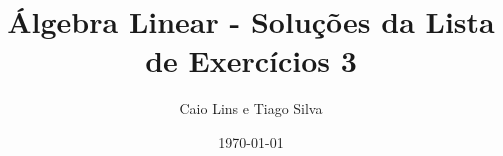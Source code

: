 \documentclass[leqno]{article}
\numberwithin{equation}{section}
\begin{document}
\newtheorem{teo}{Teorema}[section] \newtheorem*{teo*}{Teorema}
\newtheorem{prop}[teo]{Proposição} \newtheorem*{prop*}{Proposição}
\newtheorem{lema}[teo]{Lemma} \newtheorem*{lema*}{Lema}
\newtheorem{cor}[teo]{Corolário} \newtheorem*{cor*}{Corolário}

\theoremstyle{definition}
\newtheorem{defi}[teo]{Definição} \newtheorem*{defi*}{Definição}
\newtheorem{exem}[teo]{Exemplo} \newtheorem*{exem*}{Exemplo}
\newtheorem{obs}[teo]{Observação} \newtheorem*{obs*}{Observação}
\newtheorem*{hipo}{Hipóteses}
\newtheorem*{nota}{Notação}

\newcommand{\ds}{\displaystyle} \newcommand{\nl}{\newline}
\newcommand{\eps}{\varepsilon} \newcommand{\ssty}{\scriptstyle}
\newcommand{\bE}{\mathbb{E}}
\newcommand{\cB}{\mathcal{B}}
\newcommand{\cF}{\mathcal{F}}
\newcommand{\cA}{\mathcal{A}}
\newcommand{\cM}{\mathcal{M}}
\newcommand{\cD}{\mathcal{D}}
\newcommand{\cN}{\mathcal{N}}
\newcommand{\cL}{\mathcal{L}}
\newcommand{\cLN}{\mathcal{LN}}
\newcommand{\bP}{\mathbb{P}}
\newcommand{\bQ}{\mathbb{Q}}
\newcommand{\bN}{\mathbb{N}}
\newcommand{\bR}{\mathbb{R}}
\newcommand{\bZ}{\mathbb{Z}}

\newcommand{\bfw}{\mathbf{w}}
\newcommand{\bfv}{\mathbf{v}}
\newcommand{\bfu}{\mathbf{u}}


% 
\newcommand{\transpose}{\mathsf{T}}

\newenvironment{sol}
{
    \vspace{4mm}
    \noindent\textbf{Resolução:}
    \strut\newline
    \smallskip
    \hspace{-3.5mm}
}
{}

\newcommand{\bvecc}[2]{%
    \begin{bmatrix} #1 \\ #2  \end{bmatrix}
}
\newcommand{\bveccc}[3]{%
    \begin{bmatrix} #1 \\ #2 \\ #3  \end{bmatrix}
}


\title{Álgebra Linear - Soluções da Lista de Exercícios 3}

\author{Caio Lins e Tiago Silva}

\date{\today}
\end{document}
